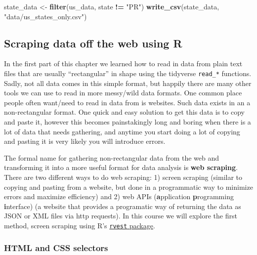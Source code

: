 \documentclass[
]{article}
\newenvironment{Shaded}{\begin{snugshade}}{\end{snugshade}}
\newcommand{\KeywordTok}[1]{\textcolor[rgb]{0.13,0.29,0.53}{\textbf{#1}}}
\newcommand{\NormalTok}[1]{#1}
\newcommand{\OperatorTok}[1]{\textcolor[rgb]{0.81,0.36,0.00}{\textbf{#1}}}
\newcommand{\StringTok}[1]{\textcolor[rgb]{0.31,0.60,0.02}{#1}}
\begin{document}
\begin{Shaded}
\begin{Highlighting}[]
\NormalTok{state\_data <{-}}\StringTok{ }\KeywordTok{filter}\NormalTok{(us\_data, state }\OperatorTok{!=}\StringTok{ "PR"}\NormalTok{)}
\KeywordTok{write\_csv}\NormalTok{(state\_data, }\StringTok{"data/us\_states\_only.csv"}\NormalTok{)}
\end{Highlighting}
\end{Shaded}

\hypertarget{scraping-data-off-the-web-using-r}{%
\subsection{Scraping data off the web using
R}\label{scraping-data-off-the-web-using-r}}

In the first part of this chapter we learned how to read in data from
plain text files that are usually ``rectangular'' in shape using the
tidyverse \texttt{read\_*} functions. Sadly, not all data comes in this
simple format, but happily there are many other tools we can use to read
in more messy/wild data formats. One common place people often want/need
to read in data from is websites. Such data exists in an a
non-rectangular format. One quick and easy solution to get this data is
to copy and paste it, however this becomes painstakingly long and boring
when there is a lot of data that needs gathering, and anytime you start
doing a lot of copying and pasting it is very likely you will introduce
errors.

The formal name for gathering non-rectangular data from the web and
transforming it into a more useful format for data analysis is
\textbf{web scraping}. There are two different ways to do web scraping:
1) screen scraping (similar to copying and pasting from a website, but
done in a programmatic way to minimize errors and maximize efficiency)
and 2) web APIs (\textbf{a}pplication \textbf{p}rogramming
\textbf{i}nterface) (a website that provides a programatic way of
returning the data as JSON or XML files via http requests). In this
course we will explore the first method, screen scraping using R's
\href{https://github.com/hadley/rvest}{\texttt{rvest} package}.

\hypertarget{html-and-css-selectors}{%
\subsubsection{HTML and CSS selectors}\label{html-and-css-selectors}}
\end{document}
